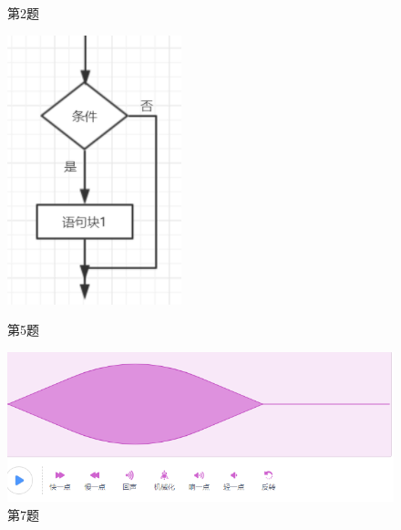 \documentclass[10pt, a4paper]{article}
\begin{document}
\begin{enumerate}
\begin{figure}[htbp]
\begin{minipage}[t]{.35\textwidth}
                \caption*{第2题}
            \end{minipage}
            \begin{minipage}[t]{.12\textwidth}
                \centering
                \includegraphics[width=\textwidth]{5.png}
                \caption*{第5题}
            \end{minipage}
            \begin{minipage}[t]{.35\textwidth}
                \centering
                \includegraphics[width=\textwidth]{7.png}
                \caption*{第7题}
            \end{minipage}
        \end{figure}


\end{enumerate}
\end{document}
